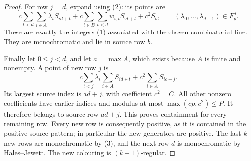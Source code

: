 \begin{proof}
For row $j=d$, expand using (2): its points are
\[
 c\sum_{t<d}\sum_{i\in A}\lambda_tS_{id+t}
 +c\sum_{i\in B}\sum_{t<d}w_{i,t}S_{id+t}+c^2S_b,
 \qquad(\lambda_0,\ldots,\lambda_{d-1})\in F_p^d.
\]
These are exactly the integers (1) associated with the chosen
combinatorial line.  They are monochromatic and lie in source row $b$.

Finally let $0\leq j<d$, and let $a=\max A$, which exists because
$A$ is finite and nonempty.  A point of new row $j$ is
\[
 c\sum_{t<j}\lambda_t\sum_{i\in A}S_{id+t}
       +c^2\sum_{i\in A}S_{id+j}.
\]
Its largest source index is $ad+j$, with coefficient $c^2=C$.
All other nonzero coefficients have earlier indices and modulus at most
$\max(cp,c^2)\leq P$.  It therefore belongs to source row $ad+j$.
This proves containment for every remaining row.
Every new row is consequently positive, as it is contained in the
positive source pattern; in particular the new generators are positive.
The last $k$ new rows are monochromatic by (3), and the next row $d$ is
monochromatic by Hales--Jewett.  The new colouring is $(k+1)$-regular.
\end{proof}

